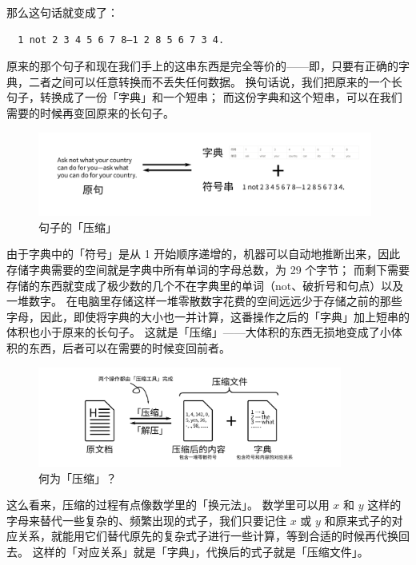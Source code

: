 那么这句话就变成了：

\begin{verbatim}
  1 not 2 3 4 5 6 7 8—1 2 8 5 6 7 3 4.
\end{verbatim}

原来的那个句子和现在我们手上的这串东西是完全等价的——即，只要有正确的字典，二者之间可以任意转换而不丢失任何数据。
换句话说，我们把原来的一个长句子，转换成了一份「字典」和一个短串；
而这份字典和这个短串，可以在我们需要的时候再变回原来的长句子。

\begin{figure}[htb!]
  \centering
  \includegraphics[width=11cm]{assets/Sentence_to_Dict.png}
  \caption{句子的「压缩」}
  \label{Sentence_to_Dict}
\end{figure}

由于字典中的「符号」是从 1 开始顺序递增的，机器可以自动地推断出来，因此存储字典需要的空间就是字典中所有单词的字母总数，为 29 个字节；
而剩下需要存储的东西就变成了极少数的几个不在字典里的单词（not、破折号和句点）以及一堆数字。
在电脑里存储这样一堆零散数字花费的空间远远少于存储之前的那些字母，因此，即使将字典的大小也一并计算，这番操作之后的「字典」加上短串的体积也小于原来的长句子。
这就是「压缩」——大体积的东西无损地变成了小体积的东西，后者可以在需要的时候变回前者。

\begin{figure}[htb!]
  \centering
  \includegraphics[width=10cm]{assets/Compressing.png}
  \caption{何为「压缩」？}
  \label{Compressing}
\end{figure}

这么看来，压缩的过程有点像数学里的「换元法」。
数学里可以用 $x$ 和 $y$ 这样的字母来替代一些复杂的、频繁出现的式子，我们只要记住 $x$ 或 $y$ 和原来式子的对应关系，就能用它们替代原先的复杂式子进行一些计算，等到合适的时候再代换回去。
这样的「对应关系」就是「字典」，代换后的式子就是「压缩文件」。

